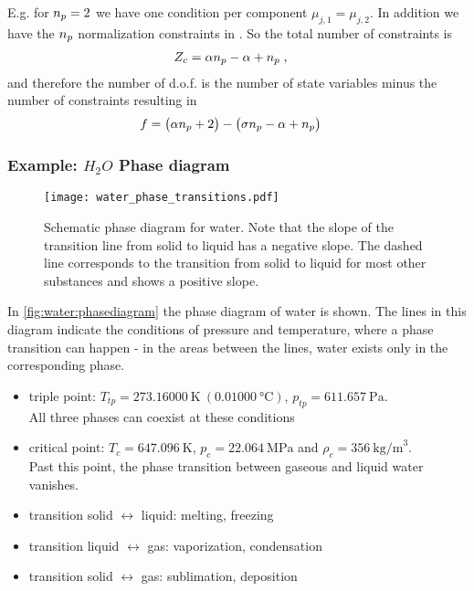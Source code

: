E.g. for $n_{p} =2$ we have one condition per component $\mu_{j,1}=\mu_{j,2}$.
In addition we have the $n_{p} $ normalization constraints in .
So the total number of constraints is 
%
\begin{align*}
Z_{c} &= \alpha n_{p} -\alpha + n_{p} \;,
\end{align*}
%
and therefore the number of d.o.f. is the number of state variables minus the number of constraints
resulting in 
%
\begin{align*}
f &=\big( \alpha n_{p} +2\big) - \big(\sigma n_{p} -\alpha+n_{p} \big)
\end{align*}
%
%
%

\subsubsection{Example: $H_{2}O$ Phase diagram}
\begin{figure}[htbp]
\begin{center}
\texttt{[image: water\_phase\_transitions.pdf]}
\caption{Schematic phase diagram for water. Note that the slope of the transition line from solid to liquid has a negative slope. The dashed line corresponds to the transition from solid to liquid for most other substances and shows a positive slope.}
\label{fig:water:phasediagram}
\end{center}
\end{figure}

In \autoref{fig:water:phasediagram} the phase diagram of water is shown. The lines in this diagram indicate the conditions of pressure and temperature, where a phase transition can happen - in the areas between the lines, water exists only in the corresponding phase. 

\begin{itemize}
	\item 
		triple point: $T_{tp}=273.16000 ~\text{K} ~(0.01000 ~\text{°C})$, $p_{tp}=611.657 ~\text{Pa}$. \\
		All three phases can coexist at these conditions
	\item
		critical point: $T_{c} = 647.096 ~\text{K}$, $p_{c} = 22.064 ~\text{MPa}$ and $\rho_{c} = 356 ~\text{kg/m}^{3}$. \\
		Past this point, the phase transition between gaseous and liquid water vanishes.
	\item 
		transition solid $\leftrightarrow$ liquid: melting, freezing 
 	\item 
		transition liquid $\leftrightarrow$ gas:  vaporization, condensation
 	\item 
		transition solid $\leftrightarrow$ gas: sublimation, deposition
\end{itemize}

